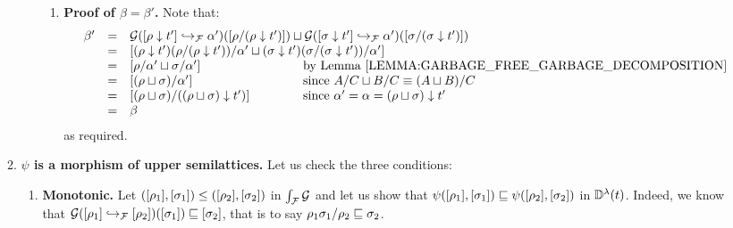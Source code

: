 \begin{enumerate}
\begin{enumerate}
\begin{enumerate}
\begin{enumerate}
      \item {\bf Proof of $\beta = \beta'$.}
        Note that:
        \[
          \begin{array}{rcll}
          \beta'
                & = & \ulbG(\ptF{\alpha'}{\cls{\redseq \sieve \tm'}})(\cls{\redseq / (\redseq \sieve \tm')}) \sqcup
                      \ulbG(\ptF{\alpha'}{\cls{\redseqtwo \sieve \tm'}})(\cls{\redseqtwo / (\redseqtwo \sieve \tm')}) \\
                & = &
                     \cls{
                       (\redseq \sieve \tm')(\redseq / (\redseq \sieve \tm'))/\alpha'
                       \sqcup
                       (\redseqtwo \sieve \tm')(\redseqtwo / (\redseqtwo \sieve \tm'))/\alpha'
                     } \\
                & = &
                     \cls{\redseq/\alpha' \sqcup \redseqtwo/\alpha'}
                     &\hspace{-5cm}\text{by \rlem{garbage_free_garbage_decomposition}} \\
                & = &
                     \cls{(\redseq \sqcup \redseqtwo)/\alpha'}
                     &\hspace{-5cm}\text{since $A/C \sqcup B/C \permeq (A \sqcup B)/C$} \\
                & = &
                     \cls{(\redseq \sqcup \redseqtwo)/((\redseq \sqcup \redseqtwo) \sieve \tm')}
                     &\hspace{-5cm}\text{since $\alpha' = \alpha = (\redseq \sqcup \redseqtwo) \sieve \tm'$} \\
                & = & \beta \\
          \end{array}
        \]
        as required. 
      \end{enumerate}
    \end{enumerate}
  \item {\bf $\psi$ is a morphism of upper semilattices.}
    Let us check the three conditions:
    \begin{enumerate}
    \item {\bf Monotonic.}
      Let $(\cls{\redseq_1},\cls{\redseqtwo_1}) \leq (\cls{\redseq_2},\cls{\redseqtwo_2})$ in $\grothy{\ulbF}{\ulbG}$
      and let us show that
      $\psi(\cls{\redseq_1},\cls{\redseqtwo_1}) \permle \psi(\cls{\redseq_2},\cls{\redseqtwo_2})$
      in $\ulbDerivLam{\tm}$.
      Indeed, we know that $\ulbG(\ptF{\cls{\redseq_2}}{\cls{\redseq_1}})(\cls{\redseqtwo_1}) \permle \cls{\redseqtwo_2}$,
      that is to say $\redseq_1\redseqtwo_1/\redseq_2 \permle \redseqtwo_2$.

\end{enumerate}
\end{enumerate}
\end{enumerate}
